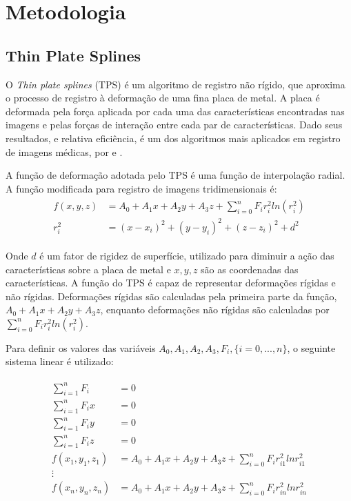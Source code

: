 \chapter{Metodologia}
\label{cap:metodologia}

\section{Thin Plate Splines}\label{thinPlateSplines}

  O \textit{Thin plate splines} (TPS) \cite{bookstein1989principal}
\cite{goshtasby1988registration} é um algoritmo de registro não rígido,
que aproxima o processo de registro à deformação de uma fina placa de metal.
A placa é deformada pela força aplicada por cada uma das características encontradas
nas imagens e pelas forças de interação entre cada par de características. Dado
seus resultados, e relativa eficiência, é um dos algoritmos mais aplicados em
registro de imagens médicas, por \cite{goshtasby2005} e \cite{rohr1999approximating}.

  A função de deformação adotada pelo TPS é uma função de interpolação radial. A
função modificada para registro de imagens tridimensionais é:
\begin{align}\label{math:tps}
  \begin{split}
    f(x, y, z) &= A_0 + A_1x + A_2y + A_3z + \sum_{i=0}^n F_i r_i^2 ln (r_i^2) \\
    r_i^2 &= (x-x_i)^2 + (y-y_i)^2 + (z-z_i)^2 + d^2
  \end{split}
\end{align}

  Onde $d$ é um fator de rigidez de superfície, utilizado para diminuir a ação
das características sobre a placa de metal e $x, y, z$ são as coordenadas das
características. A função do TPS é capaz de representar deformações
rígidas e não rígidas. Deformações rígidas são calculadas pela primeira parte
da função, $A_0 + A_1x + A_2y + A_3z$, enquanto deformações não rígidas são
calculadas por $\sum_{i=0}^n F_i r_i^2 ln (r_i^2)$.

  Para definir os valores das variáveis $A_0, A_1, A_2, A_3, F_i, \{i = 0, ..., n\}$,
o seguinte sistema linear é utilizado:

\begin{align}\label{math:tpsSystem}
\begin{split}
    \sum_{i=1}^n F_i &= 0 \\
    \sum_{i=1}^n F_ix &= 0 \\
    \sum_{i=1}^n F_iy &= 0 \\
    \sum_{i=1}^n F_iz &= 0 \\
    f(x_1,y_1,z_1) &= A_0 + A_1x + A_2y + A_3z + \sum_{i=0}^n F_i r_{i1}^2 ln r_{i1}^2 \\
    \vdots \\
    f(x_n,y_n,z_n) &= A_0 + A_1x + A_2y + A_3z + \sum_{i=0}^n F_i r_{in}^2 ln r_{in}^2
\end{split}
\end{align}

